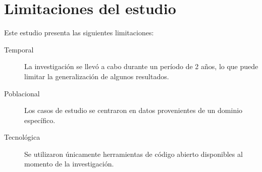 \section{Limitaciones del estudio}

Este estudio presenta las siguientes limitaciones:

\begin{description}
    \item[Temporal] La investigación se llevó a cabo durante un período de 2 años, lo que puede limitar la generalización de algunos resultados.
    \item[Poblacional] Los casos de estudio se centraron en datos provenientes de un dominio específico.
    \item[Tecnológica] Se utilizaron únicamente herramientas de código abierto disponibles al momento de la investigación.
\end{description}
